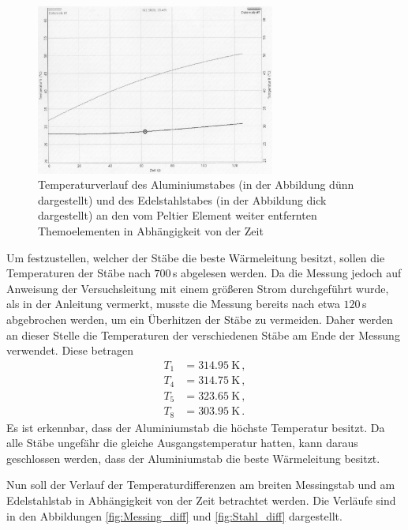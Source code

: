 \begin{figure}
  \centering
  \includegraphics[width=0.7\textwidth]{data/t5undt8.JPEG}
  \caption{Temperaturverlauf des Aluminiumstabes (in der Abbildung dünn dargestellt)
  und des Edelstahlstabes (in der Abbildung dick dargestellt) an den vom Peltier
  Element weiter entfernten Themoelementen in Abhängigkeit von der Zeit}
  \label{fig:T5_T8}
\end{figure}

Um festzustellen, welcher der Stäbe die beste Wärmeleitung besitzt, sollen die Temperaturen
der Stäbe nach $700$\,s abgelesen werden. Da die Messung jedoch auf Anweisung der Versuchsleitung
mit einem größeren Strom durchgeführt wurde, als in der Anleitung vermerkt, musste die Messung
bereits nach etwa $120$\,s abgebrochen werden, um ein Überhitzen der Stäbe zu vermeiden.
Daher werden an dieser Stelle die Temperaturen der verschiedenen Stäbe am Ende der
Messung verwendet. Diese betragen
\begin{align}
  T_1 &= \SI{314.95}{\kelvin}\,, \nonumber \\
  T_4 &= \SI{314.75}{\kelvin}\,,  \nonumber\\
  T_5 &= \SI{323.65}{\kelvin}\,,  \nonumber \\
  T_8 &= \SI{303.95}{\kelvin}\,.  \nonumber
\end{align}
Es ist erkennbar, dass der Aluminiumstab die höchste Temperatur besitzt. Da alle
Stäbe ungefähr die gleiche Ausgangstemperatur hatten, kann daraus geschlossen werden,
dass der Aluminiumstab die beste Wärmeleitung besitzt.

Nun soll der Verlauf der Temperaturdifferenzen am breiten Messingstab und am Edelstahlstab
in Abhängigkeit von der Zeit betrachtet werden. Die Verläufe sind in den Abbildungen
\ref{fig:Messing_diff} und \ref{fig:Stahl_diff} dargestellt.

